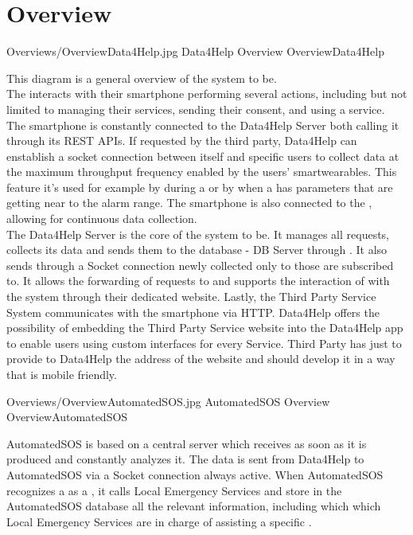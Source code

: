\documentclass[../../DD.tex]{subfiles}
\begin{document}
\section{Overview}

	\image {13cm} {Overviews/OverviewData4Help.jpg} {Data4Help Overview} {OverviewData4Help}

	This diagram is a general overview of the system to be.\\
	The  interacts with their smartphone performing several actions, including but not limited to managing their services, sending their consent, and using a service. The smartphone is constantly connected to the Data4Help Server both calling it through its REST APIs. If requested by the third party, Data4Help can enstablish a socket connection between itself and specific users to collect data at the maximum throughput frequency enabled by the users' smartwearables. This feature it's used for example by  during a  or by  when a  has parameters that are getting near to the alarm range. The smartphone is also connected to the , allowing for continuous data collection.\\
	The Data4Help Server is the core of the system to be. It manages all  requests, collects its data and sends them to the database - DB Server through . It also sends through a Socket connection newly collected  only to those  are subscribed to. It allows the forwarding of  requests to  and supports the interaction of  with the system through their dedicated website.
	Lastly, the Third Party Service System communicates with the  smartphone via HTTP. Data4Help offers the possibility of embedding the Third Party Service website into the Data4Help app to enable users using custom interfaces for every Service. Third Party has just to provide to Data4Help the address of the website and should develop it in a way that is mobile friendly.



	\image {13cm} {Overviews/OverviewAutomatedSOS.jpg} {AutomatedSOS Overview} {OverviewAutomatedSOS}

	AutomatedSOS is based on a central server which receives  as soon as it is produced and constantly analyzes it. The data is sent from Data4Help to AutomatedSOS via a Socket connection always active. When AutomatedSOS recognizes a  as a , it calls Local Emergency Services and store in the AutomatedSOS database all the relevant information, including which which Local Emergency Services are in charge of assisting a specific .
\end{document}
